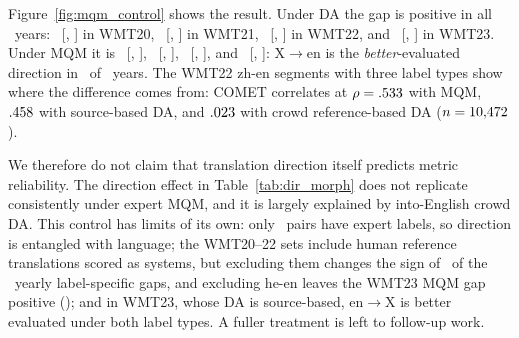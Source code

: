\documentclass[11pt]{article}
\begin{document}
Figure~\ref{fig:mqm_control} shows the result. Under DA the gap is positive in all \MqmCtrlNYearsDA\ years: \MqmCtrlGapDATwenty\ [\MqmCtrlGapDATwentyCIlo, \MqmCtrlGapDATwentyCIhi] in WMT20, \MqmCtrlGapDATwentyOne\ [\MqmCtrlGapDATwentyOneCIlo, \MqmCtrlGapDATwentyOneCIhi] in WMT21, \MqmCtrlGapDATwentyTwo\ [\MqmCtrlGapDATwentyTwoCIlo, \MqmCtrlGapDATwentyTwoCIhi] in WMT22, and \MqmCtrlGapDATwentyThree\ [\MqmCtrlGapDATwentyThreeCIlo, \MqmCtrlGapDATwentyThreeCIhi] in WMT23. Under MQM it is \MqmCtrlGapMQMTwenty\ [\MqmCtrlGapMQMTwentyCIlo, \MqmCtrlGapMQMTwentyCIhi], \MqmCtrlGapMQMTwentyOne\ [\MqmCtrlGapMQMTwentyOneCIlo, \MqmCtrlGapMQMTwentyOneCIhi], \MqmCtrlGapMQMTwentyTwo\ [\MqmCtrlGapMQMTwentyTwoCIlo, \MqmCtrlGapMQMTwentyTwoCIhi], and \MqmCtrlGapMQMTwentyThree\ [\MqmCtrlGapMQMTwentyThreeCIlo, \MqmCtrlGapMQMTwentyThreeCIhi]: X$\to$en is the \emph{better}-evaluated direction in \MqmCtrlNNegMQM\ of \MqmCtrlNYearsMQM\ years. The WMT22 zh-en segments with three label types show where the difference comes from: COMET correlates at $\rho=.533$ with MQM, $.458$ with source-based DA, and $.023$ with crowd reference-based DA ($n=10{,}472$).

We therefore do not claim that translation direction itself predicts metric reliability. The direction effect in Table~\ref{tab:dir_morph} does not replicate consistently under expert MQM, and it is largely explained by into-English crowd DA. This control has limits of its own: only \MqmCtrlNPairs\ pairs have expert labels, so direction is entangled with language; the WMT20--22 sets include human reference translations scored as systems, but excluding them changes the sign of \MqmCtrlNoHumanNSignChanges\ of the \MqmCtrlNoHumanNComparisons\ yearly label-specific gaps, and excluding he-en leaves the WMT23 MQM gap positive (\MqmCtrlGapMQMTwentyThreeNoHe); and in WMT23, whose DA is source-based, en$\to$X is better evaluated under both label types. A fuller treatment is left to follow-up work.
\end{document}
